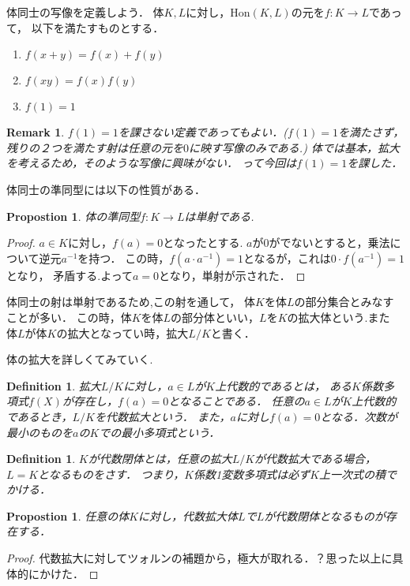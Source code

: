 \documentclass{ujarticle}
\newtheorem{dfn}[thm]{Definition}
\newtheorem{prop}[thm]{Propostion}
\newtheorem*{rem}{Remark}
\begin{document}
体同士の写像を定義しよう．
体$K,L$に対し，$\mathrm{Hon}(K,L)$の元を$f:K \to L$であって，
以下を満たすものとする．
\begin{enumerate}
  \item $f(x + y)= f(x) + f(y)$
  \item $f(xy)=f(x)f(y)$
  \item $f(1)=1$
\end{enumerate}
\begin{rem}
 $f(1)=1$を課さない定義であってもよい．($f(1)=1$を満たさず，
 残りの２つを満たす射は任意の元を$0$に映す写像のみである.)
 体では基本，拡大を考えるため，そのような写像に興味がない．
 って今回は$f(1)=1$を課した．
\end{rem}
体同士の準同型には以下の性質がある．
\begin{prop}
 体の準同型$f:K \to L$は単射である.
\end{prop}
\begin{proof}
  $a \in K$に対し，$f(a)=0$となったとする.
  $a$が$0$がでないとすると，乗法について逆元$a^{-1}$を持つ．
  この時，$f(a \cdot a^{-1})=1$となるが，これは$0 \cdot f(a^{-1})=1$となり，
  矛盾する.よって$a=0$となり，単射が示された．
\end{proof}
体同士の射は単射であるため,この射を通して，
体$K$を体$L$の部分集合とみなすことが多い．
この時，体$K$を体$L$の部分体といい，$L$を$K$の拡大体という.また
体$L$が体$K$の拡大となってい時，拡大$L/K$と書く．

体の拡大を詳しくてみていく.
\begin{dfn}
拡大$L/K$に対し，$a \in L$が$K$上代数的であるとは，
ある$K$係数多項式$f(X)$が存在し，$f(a)=0$となることである．
任意の$a \in L$が$K$上代数的であるとき，$L/K$を代数拡大という．
また，$a$に対し$f(a)=0$となる．次数が最小のものを$a$の$K$での最小多項式という．
\end{dfn}


\begin{dfn}
 $K$が代数閉体とは，任意の拡大$L/K$が代数拡大である場合，$L=K$となるものをさす．
 つまり，$K$係数1変数多項式は必ず$K$上一次式の積でかける．
\end{dfn}

\begin{prop}
 任意の体$K$に対し，代数拡大体$L$で$L$が代数閉体となるものが存在する．
\end{prop}
\begin{proof}
代数拡大に対してツォルンの補題から，極大が取れる．？思った以上に具体的にかけた．
\end{proof}
\end{document}
